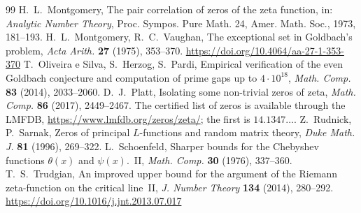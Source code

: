 \documentclass[11pt]{amsart}
\theoremstyle{remark}
\begin{document}
\begin{thebibliography}{99}
 H.~L.~Montgomery, The pair correlation of zeros of the zeta function, in: \emph{Analytic Number Theory}, Proc. Sympos. Pure Math. 24, Amer. Math. Soc., 1973, 181--193.
 H.~L.~Montgomery, R.~C.~Vaughan, The exceptional set in Goldbach's problem, \emph{Acta Arith.} \textbf{27} (1975), 353--370. \url{https://doi.org/10.4064/aa-27-1-353-370}
 T.~Oliveira e Silva, S.~Herzog, S.~Pardi, Empirical verification of the even Goldbach conjecture and computation of prime gaps up to $4\cdot10^{18}$, \emph{Math. Comp.} \textbf{83} (2014), 2033--2060.
 D.~J.~Platt, Isolating some non-trivial zeros of zeta, \emph{Math. Comp.} \textbf{86} (2017), 2449--2467. The certified list of zeros is available through the LMFDB, \url{https://www.lmfdb.org/zeros/zeta/}; the first is $14.1347\ldots$.
 Z.~Rudnick, P.~Sarnak, Zeros of principal $L$-functions and random matrix theory, \emph{Duke Math. J.} \textbf{81} (1996), 269--322.
 L.~Schoenfeld, Sharper bounds for the Chebyshev functions $\theta(x)$ and $\psi(x)$.~II, \emph{Math. Comp.} \textbf{30} (1976), 337--360.
 T.~S.~Trudgian, An improved upper bound for the argument of the Riemann zeta-function on the critical line~II, \emph{J. Number Theory} \textbf{134} (2014), 280--292. \url{https://doi.org/10.1016/j.jnt.2013.07.017}
\end{thebibliography}
\end{document}
